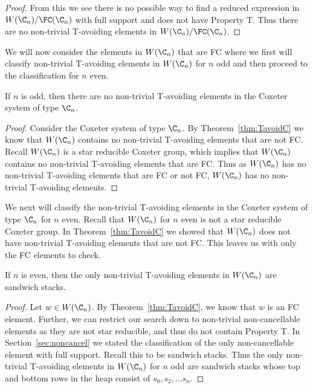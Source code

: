 \begin{theorem}
\begin{proof}
	
	From this we see there is no possible way to find a reduced expression in $W(\C_n)/\FC(\C_n)$ with full support and does not have Property T. Thus there are no non-trivial T-avoiding elements in $W(\C_n)/\FC(\C_n)$.
	\end{proof}
\end{theorem}
 
We will now consider the elements in $W(\C_n)$ that are FC where we first will classify non-trivial T-avoiding elements in $W(\C_n)$ for $n$ odd and then proceed to the classification for $n$ even.

\begin{theorem}
	If $n$ is odd, then there are no non-trivial T-avoiding elements in the Coxeter system of type $\C_n$.
	\begin{proof}
		Consider the Coxeter system of type $\C_n$. By Theorem~\ref{thm:TavoidC} we know that $W(\C_n)$ contains no non-trivial T-avoiding elements that are not FC. Recall $W(\C_n)$ is a star reducible Coxeter group, which implies that $W(\C_n)$ contains no non-trivial T-avoiding elements that are FC. Thus as $W(\C_n)$ has no non-trivial T-avoiding elements that are FC or not FC, $W(\C_n)$ has no non-trivial T-avoiding elements.
	\end{proof}
\end{theorem}

We next will classify the non-trivial T-avoiding elements in the Coxeter system of type $\C_n$ for $n$ even. Recall that $W(\C_n)$ for $n$ even is not a star reducible Coxeter group. In Theorem~\ref{thm:TavoidC} we showed that $W(\C_n)$ does not have non-trivial T-avoiding elements that are not FC. This leaves us with only the FC elements to check.

\begin{theorem}
	If $n$ is even, then the only non-trivial T-avoiding elements in $W(\C_n)$ are sandwich stacks.
	\begin{proof}
		Let $w \in W(\C_n)$. By Theorem~\ref{thm:TavoidC}, we know that $w$ is an FC element. Further, we can restrict our search down to non-trivial non-cancellable elements as they are not star reducible, and thus do not contain Property T. In Section~\ref{sec:noncancel} we stated the classification of the only non-cancellable element with full support. Recall this to be sandwich stacks. Thus the only non-trivial T-avoiding elements in $W(\C_n)$ for $n$ odd are sandwich stacks whose top and bottom rows in the heap consist of $s_0,s_2, \ldots s_n$.
	\end{proof}
\end{theorem}


